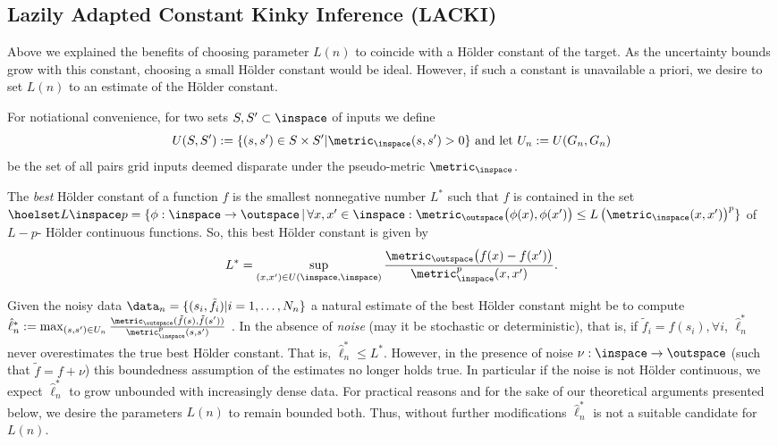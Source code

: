 

\subsection{Lazily Adapted Constant Kinky Inference (LACKI)}
\label{sec:lacki}
Above we explained the benefits of choosing parameter $L(n)$ to coincide with a H\"older constant of the target. As the uncertainty bounds grow with this constant, choosing a small H\"older constant would be ideal. 
However, if such a constant is unavailable a priori, we desire to set $L(n)$ to an estimate of the H\"older constant. 

For notiational convenience, for two sets $S,S' \subset \inspace$ of inputs we define  $$U(S,S') := \{(s,s') \in S \times S' | \metric_\inspace(s,s') >0\} \text{ and  let } U_n := U(G_n,G_n) $$ be the set of all pairs grid inputs deemed disparate under the pseudo-metric $\metric_\inspace$.

The \emph{best} H\"older constant of a function $f$ is the smallest nonnegative number $L^*$ such that $f$ is contained in the set 
$\hoelset L \inspace p = \{\phi: \inspace \to \outspace \, \vert \, \forall x,x' \in \inspace : \metric_\outspace \bigl(\phi(x),\phi(x')\bigr) \leq L \, \bigl( \metric_\inspace (x,x') \bigr)^p\} $ of $L-p$- H\"older continuous functions. So, this best H\"older constant is given by  
%
$$L^* = \sup_{(x,x') \in U(\inspace,\inspace)} \frac{\metric_\outspace \bigl(f(x) - f(x')\bigr)}{\metric_{\inspace}^p(x,x') }.$$




Given the noisy data $\data_n = \{(s_i,\tilde f_i) | i=1,\ldots,N_n\}$ a natural estimate of the best H\"older constant might be to compute $\hat \ell_n^* := \max_{(s,s') \in U_n} \frac{\metric_\outspace(\tilde f(s),\tilde f(s')) }{\metric_{\inspace}^p(s,s')}$ \cite{Strongin1973}. In the absence of \emph{noise} (may it be stochastic or deterministic), that is, if $\tilde f_i = f(s_i),\forall i$, $\hat \ell_n^*$ never overestimates the true best H\"older constant. That is, $\hat \ell_n^* \leq L^*$. However, in the presence of noise $\nu: \inspace \to \outspace$ (such that $\tilde f = f+ \nu$) this boundedness assumption of the estimates no longer holds true. In particular if the noise is not H\"older continuous, we expect $\hat \ell_n^*$ to grow unbounded with increasingly dense data.
For practical reasons and for the sake of our theoretical arguments presented below, we desire the parameters $L(n)$ to remain bounded both. Thus, without further modifications $\hat \ell_n^*$ is not a suitable candidate for $L(n)$.

